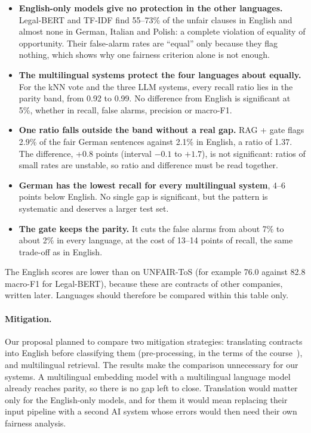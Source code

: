 \begin{itemize}
  \item \textbf{English-only models give no protection in the other languages.} Legal-BERT and TF-IDF find 55--73\% of the unfair clauses in English and almost none in German, Italian and Polish: a complete violation of equality of opportunity. Their false-alarm rates are ``equal'' only because they flag nothing, which shows why one fairness criterion alone is not enough.
  \item \textbf{The multilingual systems protect the four languages about equally.} For the kNN vote and the three LLM systems, every recall ratio lies in the parity band, from 0.92 to 0.99. No difference from English is significant at 5\%, whether in recall, false alarms, precision or macro-F1.
  \item \textbf{One ratio falls outside the band without a real gap.} RAG + gate flags 2.9\% of the fair German sentences against 2.1\% in English, a ratio of 1.37. The difference, +0.8 points (interval $-0.1$ to $+1.7$), is not significant: ratios of small rates are unstable, so ratio and difference must be read together.
  \item \textbf{German has the lowest recall for every multilingual system}, 4--6 points below English. No single gap is significant, but the pattern is systematic and deserves a larger test set.
  \item \textbf{The gate keeps the parity.} It cuts the false alarms from about 7\% to about 2\% in every language, at the cost of 13--14 points of recall, the same trade-off as in English.
\end{itemize}

The English scores are lower than on UNFAIR-ToS (for example 76.0 against 82.8 macro-F1 for Legal-BERT), because these are contracts of other companies, written later. Languages should therefore be compared within this table only.

\paragraph{Mitigation.} Our proposal planned to compare two mitigation strategies: translating contracts into English before classifying them (pre-processing, in the terms of the course~\citep{slides_mitigation}), and multilingual retrieval. The results make the comparison unnecessary for our systems. A multilingual embedding model with a multilingual language model already reaches parity, so there is no gap left to close. Translation would matter only for the English-only models, and for them it would mean replacing their input pipeline with a second AI system whose errors would then need their own fairness analysis.
